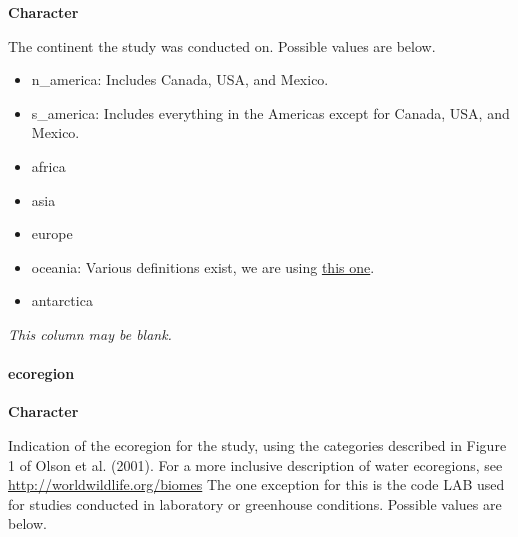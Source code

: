 \documentclass[]{article}
\let\oldparagraph\paragraph
\renewcommand{\paragraph}[1]{\oldparagraph{#1}\mbox{}}
\begin{document}
\textbf{Character}

The continent the study was conducted on. Possible values are below.

\begin{itemize}
\item
  n\_america: Includes Canada, USA, and Mexico.
\item
  s\_america: Includes everything in the Americas except for Canada,
  USA, and Mexico.
\item
  africa
\item
  asia
\item
  europe
\item
  oceania: Various definitions exist, we are using
  \href{https://en.wikipedia.org/wiki/List_of_Oceanian_countries_by_population}{this
  one}.
\item
  antarctica
\end{itemize}

\emph{This column may be blank.}

\paragraph{ecoregion}\label{ecoregion}

\textbf{Character}

Indication of the ecoregion for the study, using the categories
described in Figure 1 of Olson et al. (2001). For a more inclusive
description of water ecoregions, see
\url{http://worldwildlife.org/biomes} The one exception for this is the
code LAB used for studies conducted in laboratory or greenhouse
conditions. Possible values are below.
\end{document}
